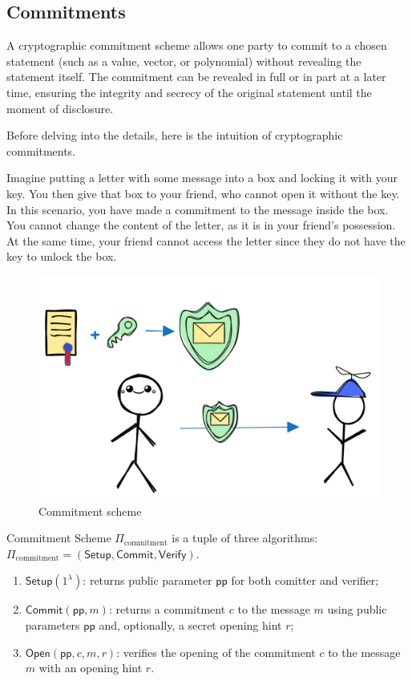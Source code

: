 \documentclass[../lecture-notes.tex]{subfiles}
\begin{document}
\subsection{Commitments}

\begin{definition}
    A cryptographic commitment scheme allows one party to commit to a chosen statement (such as a value, vector, or polynomial) without revealing the statement itself. The commitment can be revealed in full or in part at a later time, ensuring the integrity and secrecy of the original statement until the moment of disclosure.
\end{definition}

Before delving into the details, here is the intuition of cryptographic commitments.

Imagine putting a letter with some message into a box and locking it with your key. 
You then give that box to your friend, who cannot open it without the key.
In this scenario, you have made a commitment to the message inside the box. 
You cannot change the content of the letter, as it is in your friend's possession. 
At the same time, your friend cannot access the letter since they do not have the key to unlock the box.

\begin{figure}[H]
    \centering
    \includegraphics[width=0.5\linewidth, clip]{images/lecture_5/CommitmentExample.png}

    \caption{Commitment scheme}
\end{figure}

\begin{definition}
    
    Commitment Scheme $\Pi_{\text{commitment}}$ is a tuple of three algorithms: $\Pi_{\text{commitment}} = (\mathsf{Setup}, \mathsf{Commit}, \mathsf{Verify})$.

    \begin{enumerate}

        \item $\mathsf{Setup} (1^{\lambda})$: returns public parameter $\mathsf{pp}$ for both comitter and verifier;

        \item  $\mathsf{Commit} (\mathsf{pp}, m)$: returns a commitment $c$ to the message $m$ using public parameters $\mathsf{pp}$ and, optionally, a secret opening hint $r$;

        \item  $\mathsf{Open} (\mathsf{pp}, c, m, r)$: verifies the opening of the commitment $c$ to the message $m$ with an opening hint $r$. 
    \end{enumerate}
\end{definition}
\end{document}
